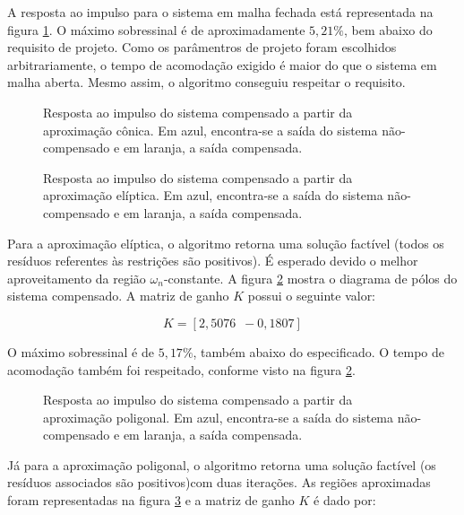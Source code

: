 A resposta ao impulso para o sistema em malha fechada está representada na figura \ref{fig:ImpulseC}. O máximo sobressinal é de aproximadamente $5,21\%$, bem abaixo do requisito de projeto. Como os parâmentros de projeto foram escolhidos arbitrariamente, o tempo de acomodação exigido é maior do que o sistema em malha aberta. Mesmo assim, o algoritmo conseguiu respeitar o requisito.

\begin{figure}[!ht]
\centering

\caption{Resposta ao impulso do sistema compensado a partir da aproximação cônica. Em azul, encontra-se a saída do sistema não-compensado e em laranja, a saída compensada.}
\label{fig:ImpulseC}
\end{figure}

\begin{figure}[!ht]
\centering

\caption{Resposta ao impulso do sistema compensado a partir da aproximação elíptica. Em azul, encontra-se a saída do sistema não-compensado e em laranja, a saída compensada.}
\label{fig:ImpulseE}
\end{figure}

Para a aproximação elíptica, o algoritmo retorna uma solução factível (todos os resíduos referentes às restrições são positivos). É esperado devido o melhor aproveitamento da região $\omega_n$-constante. A figura \ref{fig:ImpulseE} mostra o diagrama de pólos do sistema compensado. A matriz de ganho $K$ possui o seguinte valor:

\begin{equation}
K = \left[2,5076 \enspace -0,1807\right]\label{res:GanhoE}
\end{equation}

O máximo sobressinal é de $5,17\%$, também abaixo do especificado. O tempo de acomodação também foi respeitado, conforme visto na figura \ref{fig:ImpulseE}.

\begin{figure}[!htb]
\centering

\caption{Resposta ao impulso do sistema compensado a partir da aproximação poligonal. Em azul, encontra-se a saída do sistema não-compensado e em laranja, a saída compensada.}
\label{fig:ImpulseP}
\end{figure}

Já para a aproximação poligonal, o algoritmo retorna uma solução factível (os resíduos associados são positivos)com duas iterações. As regiões aproximadas foram representadas na figura \ref{fig:ImpulseP} e a matriz de ganho $K$ é dado por:

